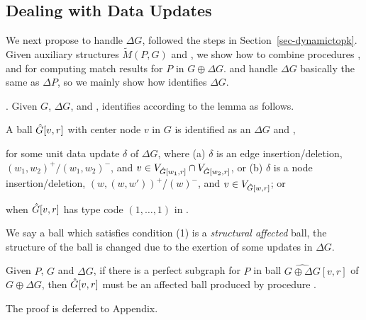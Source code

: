 \subsection{Dealing with Data Updates}
\label{subsec-Ginc}

We next propose \incd to handle $\Delta G$, followed the steps in Section~\ref{sec-dynamictopk}.
Given auxiliary structures $\tilde{M}(P,G)$ and \fb,
we show how to combine procedures \identifyaffball, \incmatch and \comb for computing match results for $P$ in $G \oplus \Delta G$.
%
\incmatch and \comb handle $\Delta G$ basically the same as $\Delta P$, so we mainly show how \identifyaffball identifies \affballsx \wrt $\Delta G$.


.
Given $G$, $\Delta G$, and \fb, \identifyaffball identifies \affballsx according to the lemma as follows.

\begin{lemma}
\label{lemma-incgrdata-affballs}
A ball $\hat{G}{[v,r]}$ with center node $v$ in $G$ is identified as an \affballx \wrt $\Delta G$ and \fb,

 for some unit data update $\delta$ of $\Delta G$, where
(a) $\delta$ is an edge insertion/deletion, $(w_1,w_2)^+/(w_1,w_2)^-$, and $v\in V_{\hat{G}{[w_1,r]}}\cap V_{\hat{G}{[w_2,r]}}$, or
(b) $\delta$ is a node insertion/deletion, $(w,(w,w'))^+$/$(w)^-$, and $v\in V_{\hat{G}{[w,r]}}$; or

 when $\hat{G}{[v,r]}$ has type code $(1,\ldots,1)$  in \fb.
\end{lemma}

We say a ball which satisfies condition (1) is a {\em structural affected} ball,
\ie the structure of the ball is changed due to the exertion of some updates in $\Delta G$.

\vspace{-0.5ex}
\begin{prop}
\label{prop-affected-datainc}
Given $P$, $G$ and $\Delta G$, if there is a perfect subgraph for $P$ in  ball $\widehat{G\oplus\Delta G}{[v,r]}$ of $G\oplus \Delta G$,
then $\hat{G}{[v,r]}$ must be an affected ball produced by procedure \identifyaffball.
\end{prop}

The proof is deferred to Appendix.

